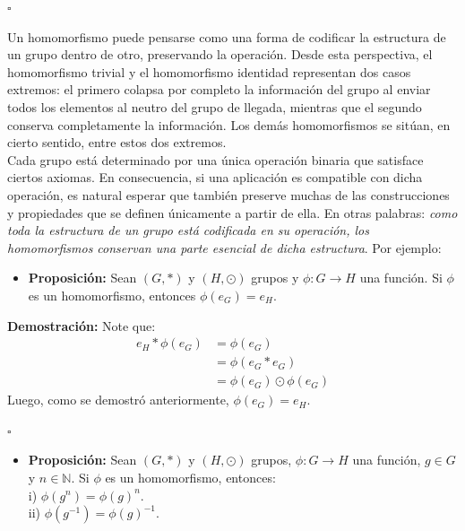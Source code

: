 \documentclass[10 pt]{article}
\begin{document}
\begin{flushright}
    $\square$
\end{flushright}

\Large{Un homomorfismo puede pensarse como una forma de codificar la estructura de un grupo dentro de otro, preservando la operación. Desde esta perspectiva, el homomorfismo trivial y el homomorfismo identidad representan dos casos extremos: el primero colapsa por completo la información del grupo al enviar todos los elementos al neutro del grupo de llegada, mientras que el segundo conserva completamente la información. Los demás homomorfismos se sitúan, en cierto sentido, entre estos dos extremos.} \\

\Large{Cada grupo está determinado por una única operación binaria que satisface ciertos axiomas. En consecuencia, si una aplicación es compatible con dicha operación, es natural esperar que también preserve muchas de las construcciones y propiedades que se definen únicamente a partir de ella. En otras palabras: \textit{como toda la estructura de un grupo está codificada en su operación, los homomorfismos conservan una parte esencial de dicha estructura}. Por ejemplo:} \\

\begin{itemize}
    \item \Large{\textbf{Proposición:} Sean $(G,*)$ y $(H,\odot)$ grupos y $\phi:G \rightarrow H$ una función. Si $\phi$ es un homomorfismo, entonces $\phi(e_G)=e_H$.} \\
\end{itemize}

\Large{\textbf{Demostración:} Note que:}
\begin{align*}
    e_H*\phi(e_G)&=\phi(e_G) \\
    &=\phi(e_G*e_G) \\
    &=\phi(e_G)\odot\phi(e_G)
\end{align*}
\Large{Luego, como se demostró anteriormente, $\phi(e_G)=e_H$.} \\

\begin{flushright}
    $\square$
\end{flushright}

\begin{itemize}
    \item \Large{\textbf{Proposición:} Sean $(G,*)$ y $(H,\odot)$ grupos, $\phi:G \rightarrow H$ una función, $g \in G$ y $n \in \mathbb N$. Si $\phi$ es un homomorfismo, entonces: \\

    i) $\phi(g^n)=\phi(g)^n$. \\

    ii) $\phi(g^{-1})=\phi(g)^{-1}$.} \\
\end{itemize}
\end{document}
